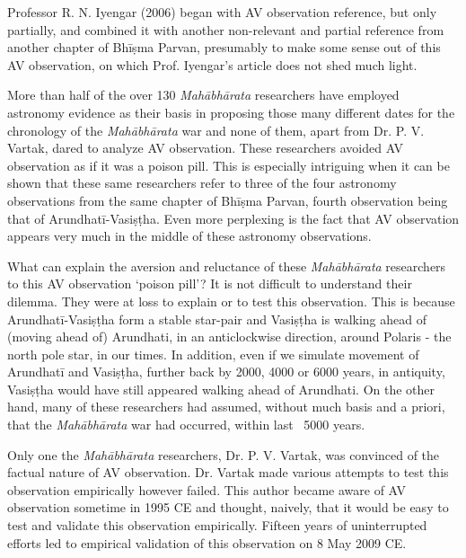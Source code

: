 \vspace{0.15cm} 


Professor R. N. Iyengar (2006) began with AV observation reference, but only partially, and combined it with another non-relevant and partial reference from another chapter of Bhīṣma Parvan, presumably to make some sense out of this AV observation, on which Prof. Iyengar’s article does not shed much light.

More than half of the over 130 \textit{Mahābhārata} researchers have employed astronomy evidence as their basis in proposing those many different dates for the chronology of the \textit{Mahābhārata} war and none of them, apart from Dr. P. V. Vartak, dared to analyze AV observation. These researchers avoided AV observation as if it was a poison pill. This is especially intriguing when it can be shown that these same researchers refer to three of the four astronomy observations from the same chapter of Bhīṣma Parvan, fourth observation being that of Arundhatī-Vasiṣṭha. Even more perplexing is the fact that AV observation appears very much in the middle of these astronomy observations.

What can explain the aversion and reluctance of these \textit{Mahābhārata} researchers to this AV observation ‘poison pill’? It is not difficult to understand their dilemma. They were at loss to explain or to test this observation. This is because Arundhatī-Vasiṣṭha form a stable star-pair and Vasiṣṭha is walking ahead of (moving ahead of) Arundhati, in an anticlockwise direction, around Polaris - the north pole star, in our times. In addition, even if we simulate movement of Arundhatī and Vasiṣṭha, further back by 2000, 4000 or 6000 years, in antiquity, Vasiṣṭha would have still appeared walking ahead of Arundhati. On the other hand, many of these researchers had assumed, without much basis and a priori, that the \textit{Mahābhārata} war had occurred, within last ~5000 years.

Only one the \textit{Mahābhārata} researchers, Dr. P. V. Vartak, was convinced of the factual nature of AV observation. Dr. Vartak made various attempts to test this observation empirically however failed. This author became aware of AV observation sometime in 1995 CE and thought, naively, that it would be easy to test and validate this observation empirically. Fifteen years of uninterrupted efforts led to empirical validation of this observation on 8 May 2009 CE.


